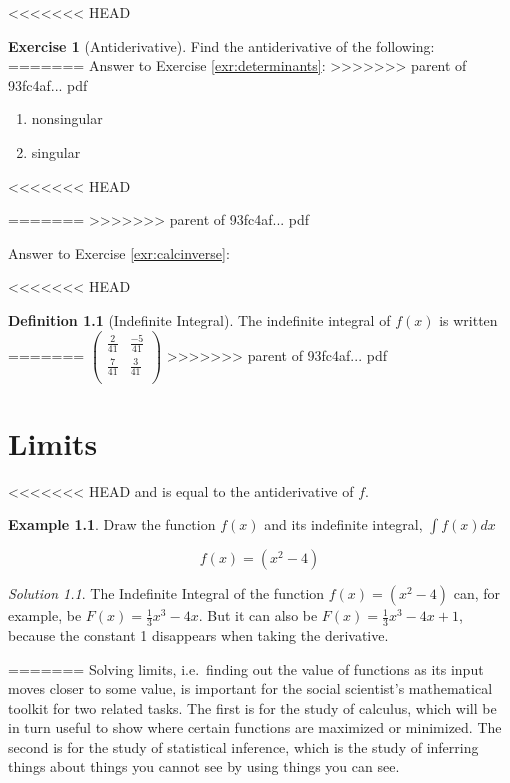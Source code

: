 \documentclass[]{book}
\theoremstyle{definition}
\newtheorem{definition}{Definition}[chapter]
\theoremstyle{definition}
\newtheorem{example}{Example}[chapter]
\theoremstyle{definition}
\newtheorem{exercise}{Exercise}[chapter]
\theoremstyle{remark}
\newtheorem*{solution}{Solution}
\begin{document}
<<<<<<< HEAD
\begin{exercise}[Antiderivative]
\protect\hypertarget{exr:unnamed-chunk-21}{}{\label{exr:unnamed-chunk-21} {} }Find the antiderivative of the following:
=======
Answer to Exercise \ref{exr:determinants}:
>>>>>>> parent of 93fc4af... pdf

\begin{enumerate}
\def\labelenumi{\arabic{enumi}.}
\item
  nonsingular
\item
  singular
\end{enumerate}
<<<<<<< HEAD
\end{exercise}
=======
>>>>>>> parent of 93fc4af... pdf

Answer to Exercise \ref{exr:calcinverse}:

<<<<<<< HEAD
\begin{definition}[Indefinite Integral]
\protect\hypertarget{def:unnamed-chunk-22}{}{\label{def:unnamed-chunk-22} {} }The indefinite integral of \(f(x)\) is written
=======
\(\begin{pmatrix}  \frac{2}{41} & \frac{-5}{41}\\  \frac{7}{41} & \frac{3}{41}\\  \end{pmatrix}\)
>>>>>>> parent of 93fc4af... pdf

\hypertarget{limits-precalc}{%
\chapter{Limits}\label{limits-precalc}}

<<<<<<< HEAD
and is equal to the antiderivative of \(f\).
\end{definition}

\begin{example}
\protect\hypertarget{exm:unnamed-chunk-23}{}{\label{exm:unnamed-chunk-23} }Draw the function \(f(x)\) and its indefinite integral, \(\int\limits f(x) dx\)

\[f(x) = (x^2-4)\]
\end{example}

\begin{solution}
{}The Indefinite Integral of the function \(f(x) = (x^2-4)\) can, for example, be \(F(x) = \frac{1}{3}x^3 - 4x.\) But it can also be \(F(x) = \frac{1}{3}x^3 - 4x + 1\), because the constant 1 disappears when taking the derivative.
\end{solution}
=======
Solving limits, i.e.~finding out the value of functions as its input moves closer to some value, is important for the social scientist's mathematical toolkit for two related tasks. The first is for the study of calculus, which will be in turn useful to show where certain functions are maximized or minimized. The second is for the study of statistical inference, which is the study of inferring things about things you cannot see by using things you can see.
\end{document}
